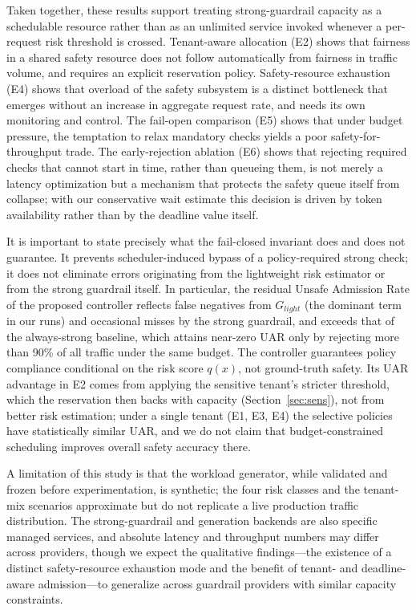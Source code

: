\documentclass[conference]{IEEEtran}
\newcommand{\Glight}{G_{\mathit{light}}}
\begin{document}
Taken together, these results support treating strong-guardrail capacity as a schedulable resource rather than as an unlimited service invoked whenever a per-request risk threshold is crossed. Tenant-aware allocation (E2) shows that fairness in a shared safety resource does not follow automatically from fairness in traffic volume, and requires an explicit reservation policy. Safety-resource exhaustion (E4) shows that overload of the safety subsystem is a distinct bottleneck that emerges without an increase in aggregate request rate, and needs its own monitoring and control. The fail-open comparison (E5) shows that under budget pressure, the temptation to relax mandatory checks yields a poor safety-for-throughput trade. The early-rejection ablation (E6) shows that rejecting required checks that cannot start in time, rather than queueing them, is not merely a latency optimization but a mechanism that protects the safety queue itself from collapse; with our conservative wait estimate this decision is driven by token availability rather than by the deadline value itself.

It is important to state precisely what the fail-closed invariant does and does not guarantee. It prevents scheduler-induced bypass of a policy-required strong check; it does not eliminate errors originating from the lightweight risk estimator or from the strong guardrail itself. In particular, the residual Unsafe Admission Rate of the proposed controller reflects false negatives from $\Glight$ (the dominant term in our runs) and occasional misses by the strong guardrail, and exceeds that of the always-strong baseline, which attains near-zero UAR only by rejecting more than 90\% of all traffic under the same budget. The controller guarantees policy compliance conditional on the risk score $q(x)$, not ground-truth safety. Its UAR advantage in E2 comes from applying the sensitive tenant's stricter threshold, which the reservation then backs with capacity (Section~\ref{sec:sens}), not from better risk estimation; under a single tenant (E1, E3, E4) the selective policies have statistically similar UAR, and we do not claim that budget-constrained scheduling improves overall safety accuracy there.

A limitation of this study is that the workload generator, while validated and frozen before experimentation, is synthetic; the four risk classes and the tenant-mix scenarios approximate but do not replicate a live production traffic distribution. The strong-guardrail and generation backends are also specific managed services, and absolute latency and throughput numbers may differ across providers, though we expect the qualitative findings---the existence of a distinct safety-resource exhaustion mode and the benefit of tenant- and deadline-aware admission---to generalize across guardrail providers with similar capacity constraints.
\end{document}
